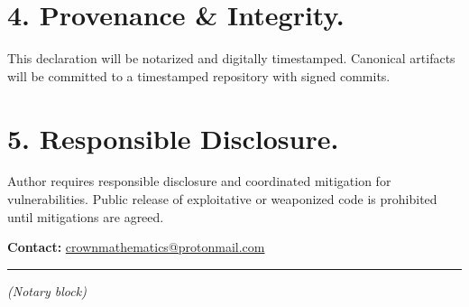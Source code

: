 \documentclass[11pt, a4paper]{article}
\begin{document}
\begin{Form}
\section*{4. Provenance \& Integrity.}
This declaration will be notarized and digitally timestamped. Canonical artifacts will be committed to a timestamped repository with signed commits.

\section*{5. Responsible Disclosure.}
Author requires responsible disclosure and coordinated mitigation for vulnerabilities. Public release of exploitative or weaponized code is prohibited until mitigations are agreed.

\vspace{1cm}

\noindent \textbf{Contact:} \href{mailto:crownmathematics@protonmail.com}{crownmathematics@protonmail.com}

\vspace{1.5cm}

\noindent {}
\hfill
{}

\vspace{1.5cm}

\begin{center}
    \hrule
    \vspace{0.2cm}
    \textit{(Notary block)}
\end{center}

\end{Form}
\end{document}
